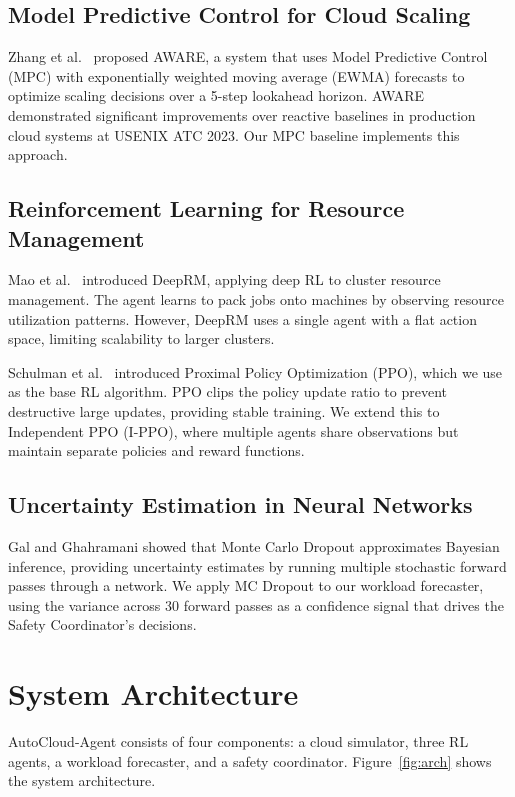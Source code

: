 \documentclass[12pt,a4paper]{article}
\begin{document}
\subsection{Model Predictive Control for Cloud Scaling}

Zhang et al.\ \cite{zhang2023aware} proposed AWARE, a system that uses Model
Predictive Control (MPC) with exponentially weighted moving average (EWMA)
forecasts to optimize scaling decisions over a 5-step lookahead horizon. AWARE
demonstrated significant improvements over reactive baselines in production
cloud systems at USENIX ATC 2023. Our MPC baseline implements this approach.

\subsection{Reinforcement Learning for Resource Management}

Mao et al.\ \cite{mao2016resource} introduced DeepRM, applying deep RL to
cluster resource management. The agent learns to pack jobs onto machines by
observing resource utilization patterns. However, DeepRM uses a single agent
with a flat action space, limiting scalability to larger clusters.

Schulman et al.\ \cite{schulman2017ppo} introduced Proximal Policy Optimization
(PPO), which we use as the base RL algorithm. PPO clips the policy update ratio
to prevent destructive large updates, providing stable training. We extend this
to Independent PPO (I-PPO), where multiple agents share observations but
maintain separate policies and reward functions.

\subsection{Uncertainty Estimation in Neural Networks}

Gal and Ghahramani \cite{gal2016dropout} showed that Monte Carlo Dropout
approximates Bayesian inference, providing uncertainty estimates by running
multiple stochastic forward passes through a network. We apply MC Dropout to
our workload forecaster, using the variance across 30 forward passes as a
confidence signal that drives the Safety Coordinator's decisions.


\section{System Architecture}


AutoCloud-Agent consists of four components: a cloud simulator, three RL agents,
a workload forecaster, and a safety coordinator. Figure~\ref{fig:arch} shows
the system architecture.
\end{document}

